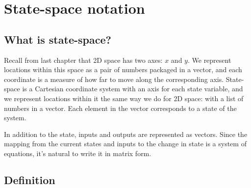 \section{State-space notation}

\subsection{What is state-space?}

Recall from last chapter that 2D space has two axes: $x$ and $y$. We represent
locations within this space as a pair of numbers packaged in a vector, and each
coordinate is a measure of how far to move along the corresponding axis.
State-space is a Cartesian coordinate system with an axis for each \gls{state}
variable, and we represent locations within it the same way we do for 2D space:
with a list of numbers in a vector. Each element in the vector corresponds to a
\gls{state} of the \gls{system}.

In addition to the \gls{state}, \glspl{input} and \glspl{output} are represented
as vectors. Since the mapping from the current \glspl{state} and \glspl{input}
to the change in \gls{state} is a system of equations, it's natural to write it
in matrix form.

\subsection{Definition}

